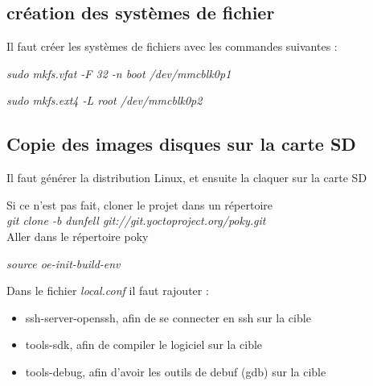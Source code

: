 \subsection{création des systèmes de fichier}

Il faut créer les systèmes de fichiers avec les commandes suivantes : 


\textit{sudo mkfs.vfat -F 32 -n boot /dev/mmcblk0p1}

\textit{sudo mkfs.ext4 -L root /dev/mmcblk0p2}



\subsection{Copie des images disques sur  la carte SD}


Il faut générer la distribution Linux, et ensuite la claquer sur la carte SD

Si ce n'est pas fait, cloner le projet dans un répertoire
\\

\textit{git clone -b dunfell git://git.yoctoproject.org/poky.git}
\\
Aller dans le répertoire poky

\textit{source oe-init-build-env}

Dans le fichier \textit{local.conf} il faut rajouter : 
\begin{itemize}
\item ssh-server-openssh, afin de se connecter en ssh sur la cible
\item tools-sdk, afin de compiler le logiciel sur la cible
\item tools-debug, afin d'avoir les outils de debuf (gdb) sur la cible

\end{itemize}


